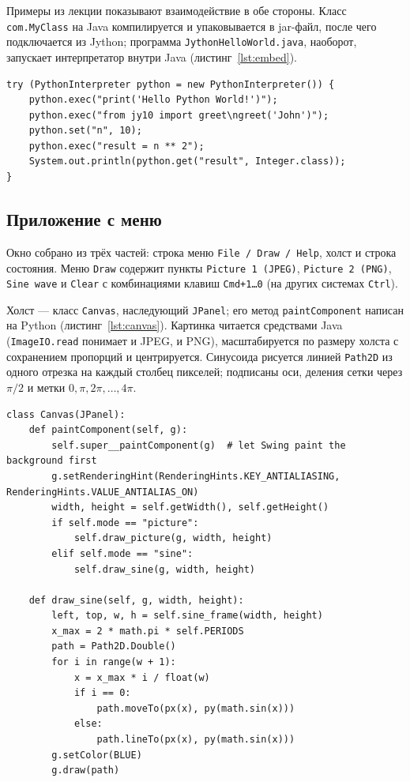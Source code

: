 \documentclass[14pt,a4paper]{extarticle}
\begin{document}
Примеры из лекции показывают взаимодействие в обе стороны. Класс
\texttt{com.MyClass} на Java компилируется и упаковывается в jar-файл, после чего
подключается из Jython; программа \texttt{JythonHelloWorld.java}, наоборот, запускает
интерпретатор внутри Java (листинг~\ref{lst:embed}).

\begin{lstlisting}[style=plain, caption={Java запускает Python}, label={lst:embed}]
try (PythonInterpreter python = new PythonInterpreter()) {
    python.exec("print('Hello Python World!')");
    python.exec("from jy10 import greet\ngreet('John')");
    python.set("n", 10);
    python.exec("result = n ** 2");
    System.out.println(python.get("result", Integer.class));
}
\end{lstlisting}

\subsection{Приложение с меню}

Окно собрано из трёх частей: строка меню \texttt{File / Draw / Help}, холст и строка
состояния. Меню \texttt{Draw} содержит пункты \texttt{Picture 1 (JPEG)},
\texttt{Picture 2 (PNG)}, \texttt{Sine wave} и \texttt{Clear} с комбинациями клавиш
\texttt{Cmd+1\ldots 0} (на других системах \texttt{Ctrl}).

Холст --- класс \texttt{Canvas}, наследующий \texttt{JPanel}; его метод
\texttt{paintComponent} написан на Python (листинг~\ref{lst:canvas}). Картинка читается
средствами Java (\texttt{ImageIO.read} понимает и JPEG, и PNG), масштабируется по
размеру холста с сохранением пропорций и центрируется. Синусоида рисуется линией
\texttt{Path2D} из одного отрезка на каждый столбец пикселей; подписаны оси, деления
сетки через $\pi/2$ и метки $0,\pi,2\pi,\dots,4\pi$.

\begin{lstlisting}[style=python, caption={Холст: метод paintComponent}, label={lst:canvas}]
class Canvas(JPanel):
    def paintComponent(self, g):
        self.super__paintComponent(g)  # let Swing paint the background first
        g.setRenderingHint(RenderingHints.KEY_ANTIALIASING, RenderingHints.VALUE_ANTIALIAS_ON)
        width, height = self.getWidth(), self.getHeight()
        if self.mode == "picture":
            self.draw_picture(g, width, height)
        elif self.mode == "sine":
            self.draw_sine(g, width, height)

    def draw_sine(self, g, width, height):
        left, top, w, h = self.sine_frame(width, height)
        x_max = 2 * math.pi * self.PERIODS
        path = Path2D.Double()
        for i in range(w + 1):
            x = x_max * i / float(w)
            if i == 0:
                path.moveTo(px(x), py(math.sin(x)))
            else:
                path.lineTo(px(x), py(math.sin(x)))
        g.setColor(BLUE)
        g.draw(path)
\end{lstlisting}
\end{document}

